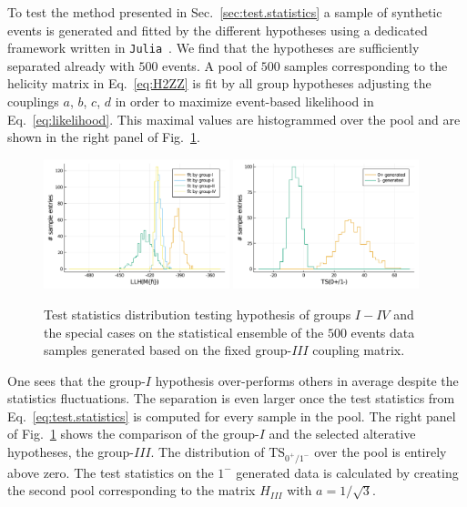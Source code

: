 \documentclass[prd,preprintnumbers,floatfix,
nofootinbib,superscriptaddress]{revtex4}
\newcommand{\TS}{\mathrm{TS}}
\newcommand{\I}{\ensuremath{I}}
\newcommand{\III}{\ensuremath{{I\!I\!I}}}
\newcommand{\IV}{\ensuremath{{I\!V}}}
\begin{document}
To test the method presented in Sec.~\ref{sec:test.statistics} a sample of synthetic events
is generated and fitted by the different hypotheses using a dedicated framework written in \texttt{Julia}~\cite{julia.JpsiJpsi}.
We find that the hypotheses are sufficiently separated already with $500$ events. %
A pool of $500$ samples corresponding to the helicity matrix in Eq.~\eqref{eq:H2ZZ} is fit by all group hypotheses adjusting the couplings $a$, $b$, $c$, $d$ in order to maximize event-based likelihood in Eq.~\eqref{eq:likelihood}.
This maximal values are histogrammed over the pool and are shown in the right panel of Fig.~\ref{fig:TS.fixedH}.
\begin{figure}
  \includegraphics[width=0.48\textwidth]{../plots/llh_testing_higgs.pdf}
  \includegraphics[width=0.48\textwidth]{../plots/TS_0p_vs_1m.pdf}
  \caption{Test statistics distribution testing hypothesis of groups $\I-\IV$ and the special cases on the statistical ensemble of the $500$ events data samples generated based on
  the fixed group-$\III$ coupling matrix. }
  \label{fig:TS.fixedH}
\end{figure}
One sees that the group-$\I$ hypothesis over-performs others in average despite the statistics fluctuations.
The separation is even larger once the test statistics from Eq.~\eqref{eq:test.statistics} is computed for every sample in the pool.
The right panel of Fig.~\ref{fig:TS.fixedH} shows the comparison of the group-$\I$ and the selected alterative hypotheses, the group-$\III$.
The distribution of $\TS_{0^+/1^-}$ over the pool is entirely above zero.
The test statistics on the $1^-$ generated data is calculated by creating the second pool corresponding to the matrix $H_\III$ with $a = 1/\sqrt{3}$.
\end{document}
